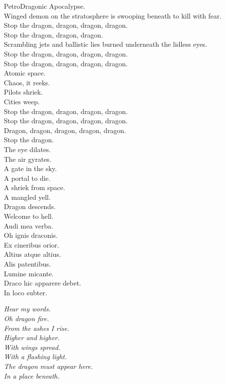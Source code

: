 PetroDragonic Apocalypse. \\

Winged demon on the stratosphere is swooping beneath to kill with fear. \\
Stop the dragon, dragon, dragon, dragon. \\
Stop the dragon, dragon, dragon. \\
Scrambling jets and ballistic lies burned underneath the lidless eyes. \\
Stop the dragon, dragon, dragon, dragon. \\
Stop the dragon, dragon, dragon, dragon. \\
Atomic space. \\
Chaos, it reeks. \\
Pilots shriek. \\
Cities weep. \\
Stop the dragon, dragon, dragon, dragon. \\
Stop the dragon, dragon, dragon, dragon. \\
Dragon, dragon, dragon, dragon, dragon. \\
Stop the dragon. \\

The eye dilates. \\
The air gyrates. \\
A gate in the sky. \\
A portal to die. \\
A shriek from space. \\
A mangled yell. \\
Dragon descends. \\
Welcome to hell. \\

Audi mea verba. \\
Oh ignis draconis. \\
Ex cineribus orior. \\
Altius atque altius. \\
Alis patentibus. \\
Lumine micante. \\
Draco hic apparere debet. \\
In loco subter. \\


{\itshape%
Hear my words. \\
Oh dragon fire. \\
From the ashes I rise. \\
Higher and higher. \\
With wings spread. \\
With a flashing light. \\
The dragon must appear here. \\
In a place beneath. \\
}

